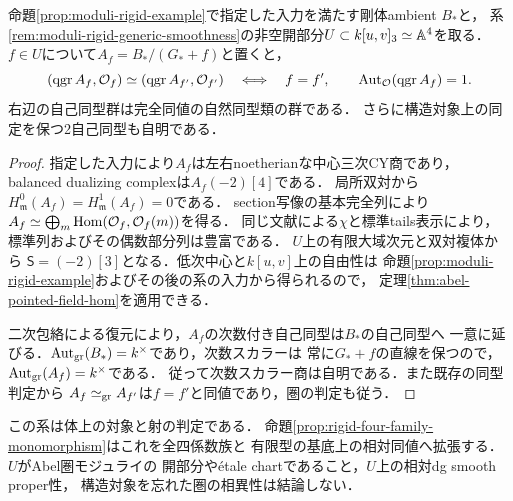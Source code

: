 \begin{corollary}[四係数族の構造対象付き圏とその自己同型]
\label{cor:abel-rigid-four-family}
命題\ref{prop:moduli-rigid-example}で指定した入力を満たす剛体ambient $B_*$と，
系\ref{rem:moduli-rigid-generic-smoothness}の非空開部分$U\subset k[u,v]_3\simeq\mathbb A^4$を取る．
$f\in U$について$A_f=B_* /(G_*+f)$と置くと，
\[
 (\operatorname{qgr} A_f,\mathcal O_f)\simeq(\operatorname{qgr} A_{f'},\mathcal O_{f'})
 \quad\Longleftrightarrow\quad f=f',
 \qquad
 \operatorname{Aut}_{\mathcal O}(\operatorname{qgr} A_f)=1.
\]
右辺の自己同型群は完全同値の自然同型類の群である．
さらに構造対象上の同定を保つ2自己同型も自明である．
\end{corollary}
\begin{proof}
指定した入力により$A_f$は左右noetherianな中心三次CY商であり，
balanced dualizing complexは$A_f(-2)[4]$である．
局所双対\cite[Theorem~4.2(1), Corollary~4.3]{YZ}から
$H^0_{\mathfrak m}(A_f)=H^1_{\mathfrak m}(A_f)=0$である．
section写像の基本完全列により
$A_f\simeq\bigoplus_m\operatorname{Hom}(\mathcal O_f,\mathcal O_f(m))$を得る．
同じ文献による$\chi$と標準tails表示により，標準列およびその偶数部分列は豊富である．
$U$上の有限大域次元と双対複体から
$\mathsf S=(-2)[3]$となる．低次中心と$k[u,v]$上の自由性は
命題\ref{prop:moduli-rigid-example}およびその後の系の入力から得られるので，
定理\ref{thm:abel-pointed-field-hom}を適用できる．

二次包絡による復元により，$A_f$の次数付き自己同型は$B_*$の自己同型へ
一意に延びる．$\operatorname{Aut}_{\rm gr}(B_*)=k^\times$であり，次数スカラーは
常に$G_*+f$の直線を保つので，$\operatorname{Aut}_{\rm gr}(A_f)=k^\times$である．
従って次数スカラー商は自明である．また既存の同型判定から
$A_f\simeq_{\rm gr}A_{f'}$は$f=f'$と同値であり，圏の判定も従う．
\end{proof}

この系は体上の対象と射の判定である．
命題\ref{prop:rigid-four-family-monomorphism}はこれを全四係数族と
有限型の基底上の相対同値へ拡張する．$U$がAbel圏モジュライの
開部分や\'etale chartであること，$U$上の相対dg smooth proper性，
構造対象を忘れた圏の相異性は結論しない．

